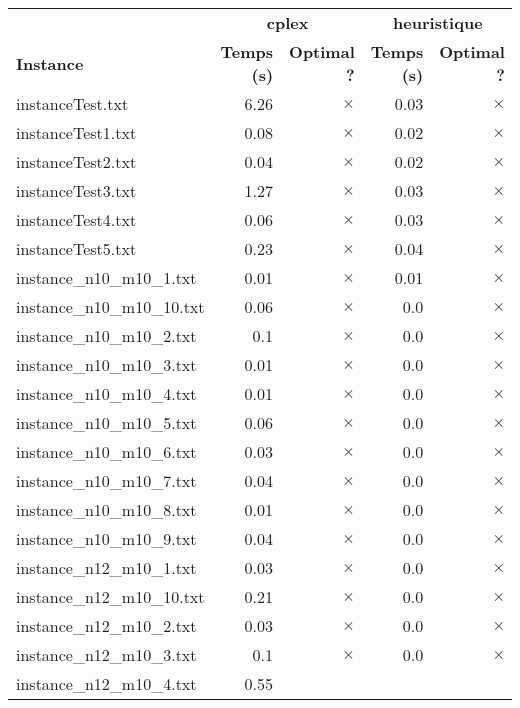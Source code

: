 \documentclass{article}
\begin{document}
\begin{center}
\renewcommand{\arraystretch}{1.4} 
 \begin{tabular}{lrrrr}
	\hline
 & \multicolumn{2}{c}{\textbf{cplex}} & \multicolumn{2}{c}{\textbf{heuristique}}\\
\textbf{Instance}  & \textbf{Temps (s)} & \textbf{Optimal ?}  & \textbf{Temps (s)} & \textbf{Optimal ?} \\\hline

instanceTest.txt & 6.26 & 
$\times$
 & 0.03 & 
$\times$
\\
instanceTest1.txt & 0.08 & 
$\times$
 & 0.02 & 
$\times$
\\
instanceTest2.txt & 0.04 & 
$\times$
 & 0.02 & 
$\times$
\\
instanceTest3.txt & 1.27 & 
$\times$
 & 0.03 & 
$\times$
\\
instanceTest4.txt & 0.06 & 
$\times$
 & 0.03 & 
$\times$
\\
instanceTest5.txt & 0.23 & 
$\times$
 & 0.04 & 
$\times$
\\
instance\_n10\_m10\_1.txt & 0.01 & 
$\times$
 & 0.01 & 
$\times$
\\
instance\_n10\_m10\_10.txt & 0.06 & 
$\times$
 & 0.0 & 
$\times$
\\
instance\_n10\_m10\_2.txt & 0.1 & 
$\times$
 & 0.0 & 
$\times$
\\
instance\_n10\_m10\_3.txt & 0.01 & 
$\times$
 & 0.0 & 
$\times$
\\
instance\_n10\_m10\_4.txt & 0.01 & 
$\times$
 & 0.0 & 
$\times$
\\
instance\_n10\_m10\_5.txt & 0.06 & 
$\times$
 & 0.0 & 
$\times$
\\
instance\_n10\_m10\_6.txt & 0.03 & 
$\times$
 & 0.0 & 
$\times$
\\
instance\_n10\_m10\_7.txt & 0.04 & 
$\times$
 & 0.0 & 
$\times$
\\
instance\_n10\_m10\_8.txt & 0.01 & 
$\times$
 & 0.0 & 
$\times$
\\
instance\_n10\_m10\_9.txt & 0.04 & 
$\times$
 & 0.0 & 
$\times$
\\
instance\_n12\_m10\_1.txt & 0.03 & 
$\times$
 & 0.0 & 
$\times$
\\
instance\_n12\_m10\_10.txt & 0.21 & 
$\times$
 & 0.0 & 
$\times$
\\
instance\_n12\_m10\_2.txt & 0.03 & 
$\times$
 & 0.0 & 
$\times$
\\
instance\_n12\_m10\_3.txt & 0.1 & 
$\times$
 & 0.0 & 
$\times$
\\
instance\_n12\_m10\_4.txt & 0.55 & 

\end{tabular}
\end{center}
\end{document}
